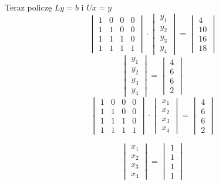 \documentclass[a4paper]{article}
\begin{document}
Teraz policzę $Ly=b$ i $Ux=y$ 
$$\begin{vmatrix}
1 & 0 & 0 & 0\\
1 & 1 & 0 & 0\\
1 & 1 & 1 & 0\\
1 & 1 & 1 & 1
\end{vmatrix} \cdot \begin{vmatrix}
y_1 \\ y_2 \\ y_3 \\ y_4
\end{vmatrix}=\begin{vmatrix}
4 \\ 10 \\ 16 \\ 18
\end{vmatrix}$$
$$\begin{vmatrix}
y_1 \\ y_2 \\ y_3 \\ y_4
\end{vmatrix} = \begin{vmatrix}
4 \\ 6 \\ 6 \\ 2
\end{vmatrix} $$
$$\begin{vmatrix}
1 & 0 & 0 & 0\\
1 & 1 & 0 & 0\\
1 & 1 & 1 & 0\\
1 & 1 & 1 & 1
\end{vmatrix} \cdot \begin{vmatrix}
x_1 \\ x_2 \\ x_3 \\ x_4
\end{vmatrix}=\begin{vmatrix}
4 \\ 6 \\ 6 \\ 2
\end{vmatrix}$$

$$\begin{vmatrix}
x_1 \\ x_2 \\ x_3 \\ x_4
\end{vmatrix} = \begin{vmatrix}
1 \\ 1 \\ 1 \\ 1
\end{vmatrix} $$
\end{document}
